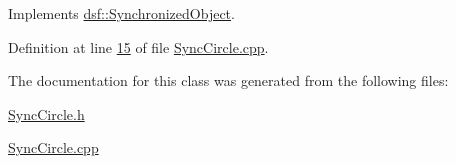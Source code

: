 Implements \hyperlink{classdsf_1_1_synchronized_object_ae94875bd63d8071f8a563ac45ca7ccc2}{dsf\+::\+Synchronized\+Object}.



Definition at line \hyperlink{_sync_circle_8cpp_source_l00015}{15} of file \hyperlink{_sync_circle_8cpp_source}{Sync\+Circle.\+cpp}.



The documentation for this class was generated from the following files\+:\begin{DoxyCompactItemize}
\item 
\hyperlink{_sync_circle_8h}{Sync\+Circle.\+h}\item 
\hyperlink{_sync_circle_8cpp}{Sync\+Circle.\+cpp}\end{DoxyCompactItemize}
